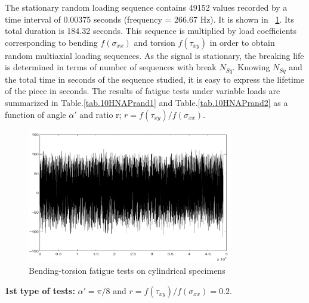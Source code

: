 \documentclass[3p,times,number,review]{elsarticle}
\newcommand{\figref}[1]{\figurename~\ref{#1}}
\begin{document}
The stationary random loading sequence contains 49152 values recorded by a time interval of 0.00375 seconds (frequency = 266.67 Hz). It is shown in \figref{fig.10HNAPrandom}. Its total duration is 184.32 seconds. This sequence is multiplied by load coefficients corresponding to bending $f (\sigma_{xx})$ and torsion $f (\tau_{xy})$ in order to obtain random multiaxial loading sequences. As the signal is stationary, the breaking life is determined in terms of number of sequences with break $N_{Sq}$. Knowing $N_{Sq}$ and the total time in seconds of the sequence studied, it is easy to express the lifetime of the piece in seconds. The results of fatigue tests under variable loads are summarized in Table.\ref{tab.10HNAPrand1} and Table.\ref{tab.10HNAPrand2} as a function of angle $\alpha'$ and ratio r; $r =f(\tau_{xy})/f(\sigma_{xx})$.
\begin{figure}[!h]
	\centering
	\includegraphics[width=0.8\textwidth]{figures//10HNAPrandom.png} 
	\caption{Bending-torsion fatigue tests on cylindrical specimens\cite{carpinteri2003multiaxial}}
	\label{fig.10HNAPrandom}
\end{figure}

\textbf{1st type of tests:} $\alpha' = \pi / 8$ and $r =f(\tau_{xy})/f(\sigma_{xx})=0.2$.
\end{document}

